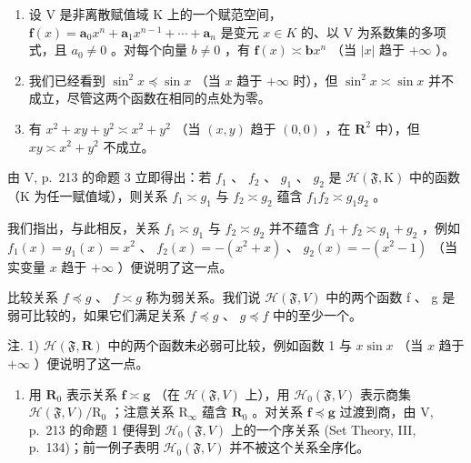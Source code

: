 \begin{enumerate}
\def\labelenumi{\arabic{enumi})}
\setcounter{enumi}{1}
\item
  设 V 是非离散赋值域 K 上的一个赋范空间，\(\mathbf{f}(x)=\mathbf{a}_{0}x^{n}+\mathbf{a}_{1}x^{n-1}+\cdots+\mathbf{a}_{n}\) 是变元 \(x\in K\) 的、以 V 为系数集的多项式，且 \(a_{0}\neq0\) 。对每个向量 \(b\neq0\) ，有 \(\mathbf{f}(x)\asymp\mathbf{b}x^{n}\) （当 \(|x|\) 趋于 \(+\infty\) ）。
\item
  我们已经看到 \(\sin^2 x \preccurlyeq \sin x\) （当 \(x\) 趋于 \(+\infty\) 时），但 \(\sin^2 x \asymp \sin x\) 并不成立，尽管这两个函数在相同的点处为零。
\item
  有 \(x^{2} + xy + y^{2} \asymp x^{2} + y^{2}\) （当 \((x, y)\) 趋于 \((0, 0)\) ，在 \(\mathbf{R}^2\) 中），但 \(xy \asymp x^{2} + y^{2}\) 不成立。
\end{enumerate}

由 V, p.~213 的命题 3 立即得出：若 \(f_1\) 、 \(f_2\) 、 \(g_1\) 、 \(g_2\) 是 \(\mathcal{H}(\mathfrak{F},\mathrm{K})\) 中的函数（K 为任一赋值域），则关系 \(f_1 \asymp g_1\) 与 \(f_2 \asymp g_2\) 蕴含 \(f_1f_2 \asymp g_1g_2\) 。

我们指出，与此相反，关系 \(f_{1} \asymp g_{1}\) 与 \(f_{2} \asymp g_{2}\) 并不蕴含 \(f_{1} + f_{2} \asymp g_{1} + g_{2}\) ，例如 \(f_{1}(x) = g_{1}(x) = x^{2}\) 、 \(f_{2}(x) = -(x^{2} + x)\) 、 \(g_{2}(x) = -(x^{2} - 1)\) （当实变量 \(x\) 趋于 \(+\infty\) ）便说明了这一点。

比较关系 \(f \preccurlyeq g\) 、 \(f \asymp g\) 称为弱关系。我们说 \(\mathcal{H}(\mathfrak{F}, V)\) 中的两个函数 f 、 g 是弱可比较的，如果它们满足关系 \(f \preccurlyeq g\) 、 \(g \preccurlyeq f\) 中的至少一个。

注. 1) \(\mathcal{H}(\mathfrak{F},\mathbf{R})\) 中的两个函数未必弱可比较，例如函数 1 与 \(x\sin x\) （当 \(x\) 趋于 \(+\infty\) ）便说明了这一点。

\begin{enumerate}
\def\labelenumi{\arabic{enumi})}
\setcounter{enumi}{1}
\tightlist
\item
  用 \(\mathbf{R}_0\) 表示关系 \(\mathbf{f} \asymp \mathbf{g}\) （在 \(\mathcal{H}(\mathfrak{F}, V)\) 上），用 \(\mathcal{H}_0(\mathfrak{F}, V)\) 表示商集 \(\mathcal{H}(\mathfrak{F}, V)/\mathrm{R}_0\) ；注意关系 \(\mathrm{R}_{\infty}\) 蕴含 \(\mathbf{R}_0\) 。对关系 \(\mathbf{f} \preccurlyeq \mathbf{g}\) 过渡到商，由 V, p.~213 的命题 1 便得到 \(\mathcal{H}_0(\mathfrak{F}, V)\) 上的一个序关系 (Set Theory, III, p.~134)；前一例子表明 \(\mathcal{H}_0(\mathfrak{F}, V)\) 并不被这个关系全序化。
\end{enumerate}

